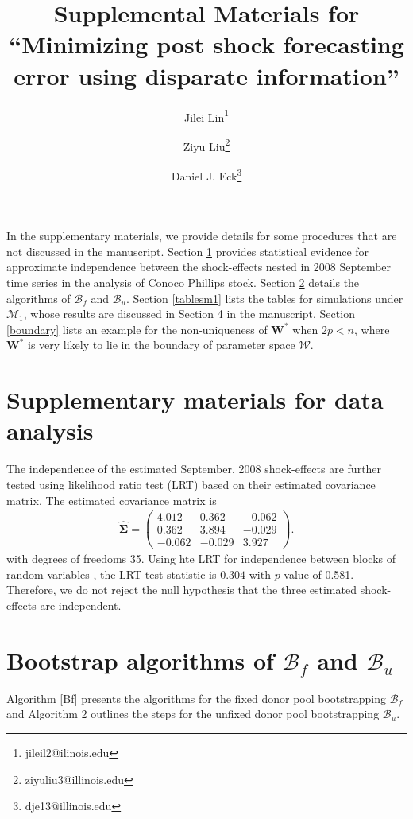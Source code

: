 \documentclass[11pt]{article}
\title{Supplemental Materials for ``Minimizing post shock forecasting error using disparate information''}
\author{Jilei Lin\thanks{jileil2@ilinois.edu}}
\author{Ziyu Liu\thanks{ziyuliu3@illinois.edu}}
\author{Daniel J. Eck\thanks{dje13@illinois.edu}}
\affil{Department of Statistics, University of Illinois at Urbana-Champaign}
\def\mbf#1{\mathbf{#1}} %
\def\mc#1{\mathcal{#1}} %
\theoremstyle{definition}
\begin{document}
\maketitle

In the supplementary materials, we provide details for some procedures that are not discussed in the manuscript. Section \ref{smfda} provides statistical evidence for approximate independence between  the shock-effects nested in 2008 September time series in the analysis of Conoco Phillips stock. Section \ref{bf} details the algorithms of $\mc{B}_f$ and $\mc{B}_u$. Section  \ref{tablesm1} lists the tables for simulations under $\mc{M}_1$, whose results are discussed in Section 4 in the manuscript. Section \ref{boundary} lists an example for the non-uniqueness of $\mbf{W}^*$ when $2p < n$, where $\mbf{W}^*$ is very likely to lie in the boundary of parameter space $\mc{W}$.


\section{Supplementary materials for data analysis}
\label{smfda}
The independence of the estimated September, 2008 shock-effects are further tested using likelihood ratio test (LRT) based on their estimated covariance matrix. The estimated covariance matrix is
\begin{align*}
  \hat{\mathbf{\Sigma}}=\left(\begin{array}{rrr}
    4.012 & 0.362 & -0.062 \\
    0.362 & 3.894 & -0.029 \\
    -0.062 & -0.029 & 3.927
  \end{array}\right).
\end{align*}
with degrees of freedoms 35. Using hte LRT for independence between blocks of random variables \citep[Section 10.2]{msos}, the LRT test statistic is $0.304$ with $p$-value of 0.581. Therefore, we do not reject  the null hypothesis that the three estimated shock-effects are independent. 

\section{Bootstrap algorithms of  $\mc{B}_f$ and $\mc{B}_u$}
\label{bf}

Algorithm \ref{Bf} presents the algorithms for the fixed donor pool bootstrapping  $\mc{B}_f$ and Algorithm 2 outlines the steps for the unfixed donor pool bootstrapping $\mc{B}_u$.
\end{document}
